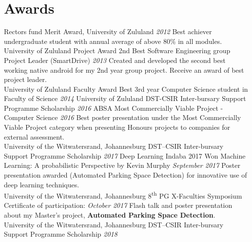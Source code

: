 \documentclass[letterpaper]{moderncv}        %
\begin{document}
				\section{Awards}
				\cventry
				{Rector\textquotesingle{}s fund}
				{Merit Award, University of Zululand}
				{}
				{\textit{2012}}
				{}
				{Best achiever undergraduate student with annual average of above 80\% in all modules.\\University of Zululand}
				\vspace{1mm}
				\cventry
				{Project Award}
				{2nd Best Software Engineering group Project Leader (SmartDrive)}
				{}
				{\textit{2013}}
				{}
				{Created and developed the second best working native android for my 2nd year group project. Receive an award of best project leader.\\University of Zululand}
				\vspace{1mm}
				\cventry
				{Faculty Award}
				{Best 3rd year Computer Science student in Faculty of Science}
				{}
				{\textit{2014}}
				{}
				{University of Zululand}
				\vspace{1mm}
				\cventry
				{DST-CSIR}
				{Inter-bursary Support Programme Scholarship}
				{}
				{\textit{2016}}
				{}
				{}
				\vspace{1mm}
				\cventry
				{ABSA}
				{Most Commercially Viable Project - Computer Science}
				{}
				{\textit{2016}}
				{}
				{Best poster presentation under the Most Commercially Viable Project category when presenting Honours projects to companies for external assessment.\\University of the Witwatersrand, Johannesburg}
				\vspace{1mm}
				\cventry
				{DST–CSIR}
				{Inter-bursary Support Programme Scholarship}
				{}
				{\textit{2017}}
				{}
				{}
				\vspace{1mm}
				\cventry
				{Deep Learning Indaba 2017}
				{Won \textquotesingle{}Machine Learning: A probabilistic Perspective by Kevin Murphy\textquotesingle{}}
				{}
				{\textit{September 2017}}
				{}
				{Poster presentation awarded (Automated Parking Space Detection) for innovative use of deep learning techniques.\\University of the Witwatersrand, Johannesburg}
				\vspace{1mm}
				\cventry
				{8\textsuperscript{th} PG X-Faculties Symposium}
				{Certificate of participation:}
				{}
				{\textit{October 2017}}
				{}
				{Flash talk and poster presentation about my Master's project, \textbf{Automated Parking Space Detection}.\\University of the Witwatersrand, Johannesburg}
				\vspace{1mm}
				\cventry
				{DST–CSIR}
				{Inter-bursary Support Programme Scholarship}
				{}
				{\textit{2018}}
				{}
				{}
				\vspace{1mm}
\end{document}
